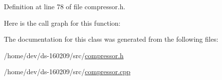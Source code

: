 Definition at line 78 of file compressor.\+h.



Here is the call graph for this function\+:




The documentation for this class was generated from the following files\+:\begin{DoxyCompactItemize}
\item 
/home/dev/ds-\/160209/src/\hyperlink{compressor_8h}{compressor.\+h}\item 
/home/dev/ds-\/160209/src/\hyperlink{compressor_8cpp}{compressor.\+cpp}\end{DoxyCompactItemize}
